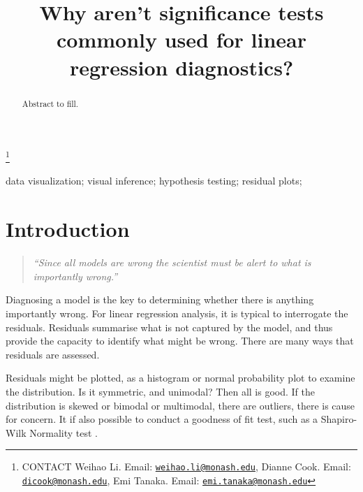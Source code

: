 \documentclass[]{interact}
\theoremstyle{plain}%
\theoremstyle{definition}
\theoremstyle{remark}
\begin{document}

\title{Why aren't significance tests commonly used for linear regression
diagnostics?}


\author{
}

\thanks{CONTACT Weihao
Li. Email: \href{mailto:weihao.li@monash.edu}{\nolinkurl{weihao.li@monash.edu}}, Dianne
Cook. Email: \href{mailto:dicook@monash.edu}{\nolinkurl{dicook@monash.edu}}, Emi
Tanaka. Email: \href{mailto:emi.tanaka@monash.edu}{\nolinkurl{emi.tanaka@monash.edu}}}

\maketitle

\begin{abstract}
Abstract to fill.
\end{abstract}

\begin{keywords}
data visualization; visual inference; hypothesis testing; residual
plots;
\end{keywords}

\hypertarget{introduction}{%
\section{Introduction}\label{introduction}}

\begin{quote}
\emph{``Since all models are wrong the scientist must be alert to what
is importantly wrong.''} \citep{REF}
\end{quote}

Diagnosing a model is the key to determining whether there is anything
importantly wrong. For linear regression analysis, it is typical to
interrogate the residuals. Residuals summarise what is not captured by
the model, and thus provide the capacity to identify what might be
wrong. There are many ways that residuals are assessed.

Residuals might be plotted, as a histogram or normal probability plot to
examine the distribution. Is it symmetric, and unimodal? Then all is
good. If the distribution is skewed or bimodal or multimodal, there are
outliers, there is cause for concern. It if also possible to conduct a
goodness of fit test, such as a Shapiro-Wilk Normality test \citep{REF}.
\end{document}
